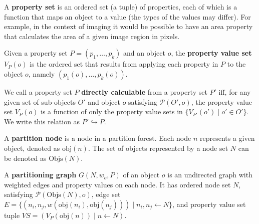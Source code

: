 \begin{definition}
A \textbf{property set} is an ordered set (a tuple) of properties, each of which is a function that maps an object to a value (the types of the values may differ). For example, in the context of imaging it would be possible to have an area property that calculates the area of a given image region in pixels.
\end{definition}

\begin{definition}
Given a property set $P = (p_1,\ldots,p_k)$ and an object $o$, the \textbf{property value set} $V_P(o)$ is the ordered set that results from applying each property in $P$ to the object $o$, namely $(p_1(o),\ldots,p_k(o))$.
\end{definition}

\begin{definition}
We call a property set $P$ \textbf{directly calculable} from a property set $P'$ iff, for any given set of sub-objects $O'$ and object $o$ satisfying $\mathcal{P}(O',o)$, the property value set $V_P(o)$ is a function of only the property value sets in $\{V_{P'}(o') \; | \; o' \in O'\}$. We write this relation as $P' \hookrightarrow P$.
\end{definition}

\begin{definition}
A \textbf{partition node} is a node in a partition forest. Each node $n$ represents a given object, denoted as $\mbox{obj}(n)$. The set of objects represented by a node set $N$ can be denoted as $\mbox{Objs}(N)$.
\end{definition}

\begin{definition}
A \textbf{partitioning graph} $G(N,w_o,P)$ of an object $o$ is an undirected graph with weighted edges and property values on each node. It has ordered node set $N$, satisfying $\mathcal{P}(\mbox{Objs}(N),o)$, edge set $E = \{(n_i,n_j,w(\mbox{obj}(n_i),\mbox{obj}(n_j))) \; | \; n_i, n_j \leftarrow N\}$, and property value set tuple $VS = (V_P(\mbox{obj}(n)) \; | \; n \leftarrow N)$.
\end{definition}


